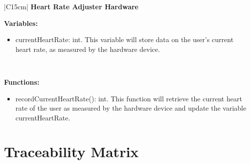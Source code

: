 \documentclass[letterpaper,english, 12pt]{scrreprt}
\begin{document}
\begin{center}
	\begin{tabular}{|C{15cm}|}
		\hline
			\textbf{Heart Rate Adjuster Hardware} \\
		\hline
			\begin{flushleft}
				\textbf{Variables:} \\
			\end{flushleft}
				\begin{itemize}
					\item currentHeartRate: int. This variable will store data on the user's current heart rate, as measured by the hardware device.
				\end{itemize} \\
			\hline
			\begin{flushleft}
				\textbf{Functions: } \\
			\end{flushleft}
				\begin{itemize}
					\item recordCurrentHeartRate(): int. This function will retrieve the current heart rate of the user as measured by the hardware device and update the variable currentHeartRate.
				\end{itemize}
			\cr \hline
	\end{tabular}
\end{center}



\section{Traceability Matrix}
\end{document}
